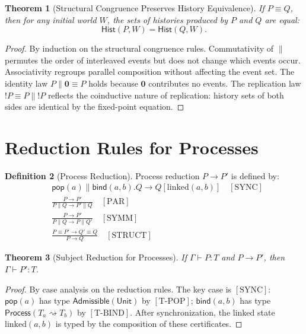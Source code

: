\documentclass[12pt, a4paper, openany]{book}
\theoremstyle{plain}
\newtheorem{theorem}{Theorem}[chapter]
\theoremstyle{definition}
\newtheorem{definition}[theorem]{Definition}
\theoremstyle{remark}
\newcommand{\Adm}{\mathsf{Admissible}}
\newcommand{\Proc}{\mathsf{Process}}
\begin{document}
\begin{theorem}[Structural Congruence Preserves History Equivalence]
If $P \equiv Q$, then for any initial world $W$, the sets of histories produced
by $P$ and $Q$ are equal:
\[
\mathsf{Hist}(P, W) = \mathsf{Hist}(Q, W).
\]
\end{theorem}

\begin{proof}
By induction on the structural congruence rules. Commutativity of $\parallel$
permutes the order of interleaved events but does not change which events occur.
Associativity regroups parallel composition without affecting the event set.
The identity law $P \parallel \mathbf{0} \equiv P$ holds because $\mathbf{0}$
contributes no events. The replication law ${!}P \equiv P \parallel {!}P$
reflects the coinductive nature of replication: history sets of both sides are
identical by the fixed-point equation.
\end{proof}

\section{Reduction Rules for Processes}

\begin{definition}[Process Reduction]
Process reduction $P \to P'$ is defined by:
\begin{align*}
&\mathsf{pop}(a) \parallel \mathsf{bind}(a, b).Q \to Q[\text{linked}(a,b)]
  \quad [\mathrm{SYNC}] \\
&\frac{P \to P'}{P \parallel Q \to P' \parallel Q} \quad [\mathrm{PAR}] \\
&\frac{P \to P'}{P \parallel Q \to P \parallel Q'} \quad [\mathrm{SYMM}] \\
&\frac{P \equiv P' \to Q' \equiv Q}{P \to Q} \quad [\mathrm{STRUCT}]
\end{align*}
\end{definition}

\begin{theorem}[Subject Reduction for Processes]
If $\Gamma \vdash P : T$ and $P \to P'$, then $\Gamma \vdash P' : T$.
\end{theorem}

\begin{proof}
By case analysis on the reduction rules. The key case is $[\mathrm{SYNC}]$:
$\mathsf{pop}(a)$ has type $\Adm(\mathsf{Unit})$ by $[\mathrm{T\text{-}POP}]$;
$\mathsf{bind}(a,b)$ has type $\Proc(T_a \rightsquigarrow T_b)$ by
$[\mathrm{T\text{-}BIND}]$. After synchronization, the linked state
$\text{linked}(a,b)$ is typed by the composition of these certificates.
\end{proof}
\end{document}
